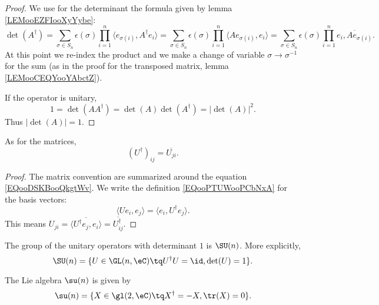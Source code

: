 \begin{proof}
    We use for the determinant the formula given by lemma \ref{LEMooEZFIooXyYybe}:
    \begin{equation}
        \det(A^{\dag})=\sum_{\sigma\in S_n}\epsilon(\sigma)\prod_{i=1}^n\langle e_{\sigma(i)}, A^{\dag}e_i\rangle =  \sum_{\sigma\in S_n}\epsilon(\sigma)\prod_{i=1}^n \langle Ae_{\sigma(i)}, e_i\rangle = \sum_{\sigma\in S_n}\epsilon(\sigma)\prod_{i=1}^n\overline{ e_i,Ae_{\sigma(i)} }.
    \end{equation}
    At this point we re-index the product and we make a change of variable $\sigma\to \sigma^{-1}$ for the sum (as in the proof for the transposed matrix, lemma \ref{LEMooCEQYooYAbctZ}).

    If the operator is unitary,
    \begin{equation}
        1=\det(AA^{\dag})=\det(A)\det(A^{\dag})=| \det(A) |^2.
    \end{equation}
    Thus \( | \det(A) |=1\).
\end{proof}


\begin{lemma}
    As for the matrices,
    \begin{equation}
        (U^{\dag})_{ij}=\overline{ U_{ji} }.
    \end{equation}
\end{lemma}

\begin{proof}
    The matrix convention are summarized around the equation \eqref{EQooDSKBooQkgtWv}. We write the definition \eqref{EQooPTUWooPCbNxA} for the basis vectors:
    \begin{equation}
        \langle Ue_i, e_j\rangle =\langle e_i, U^{\dag}e_j\rangle .
    \end{equation}
    This means \( U_{ji}=\overline{ \langle U^{\dag}e_j, e_i\rangle  }=\overline{ U^{\dag}_{ij} }\).
\end{proof}

\begin{definition}        \label{DEFooVIQUooQbnYMu}
    The group of the unitary operators with determinant \( 1\) is \( \SU(n)\). More explicitly,
    \begin{equation}
        \SU(n)=\{U\in \GL(n,\eC)\tq U^{\dag}U=\id,\det(U)=1\}.
    \end{equation}
\end{definition}

\begin{proposition}     \label{PROPooAKZEooEfpxPp}
    The Lie algebra \( \su(n)\) is given by
    \begin{equation}
        \su(n)=\{X\in\gl(2,\eC)\tq X^{\dag}=-X,\tr(X)=0\}.
    \end{equation}
\end{proposition}

